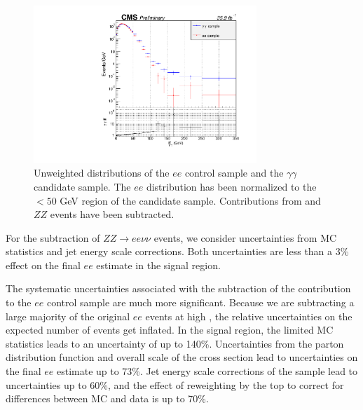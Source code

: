 \begin{figure}[h]
\begin{center}
\includegraphics[width=0.75\textwidth]{Figures/Appendix/compare_ee_gg_unweighted.pdf}
\end{center}
\caption{Unweighted \ETmiss distributions of the $ee$ control sample and the $\gamma\gamma$ candidate sample.
The $ee$ distribution has been normalized to the \ETmiss$<50$ GeV region of the candidate sample. Contributions 
from \ttbar and $ZZ$ events have been subtracted.}
\label{fig:eeUnweighted}
\end{figure}


For the subtraction of $ZZ \rightarrow ee\nu\nu$ events, 
we consider uncertainties from
MC statistics and jet energy scale corrections.
Both uncertainties are less than a 3\% effect
on the final $ee$ estimate in the signal region.

The systematic uncertainties associated with 
the subtraction of the \ttbar contribution to the $ee$ control
sample are much more significant. 
Because we are subtracting a large majority of the
original $ee$ events at high \ETmiss, the relative
uncertainties on the expected number of \ttbar events get inflated.
In the signal region, the limited MC \ttbar statistics
leads to an uncertainty of up to 140\%. Uncertainties
from the parton distribution function and overall
scale of the cross section lead to uncertainties
on the final $ee$ estimate up to 73\%.
Jet energy scale corrections
of the \ttbar sample lead to uncertainties up to
60\%, and the effect of reweighting by the
top \pt to correct for differences between
MC and data is up to 70\%.

